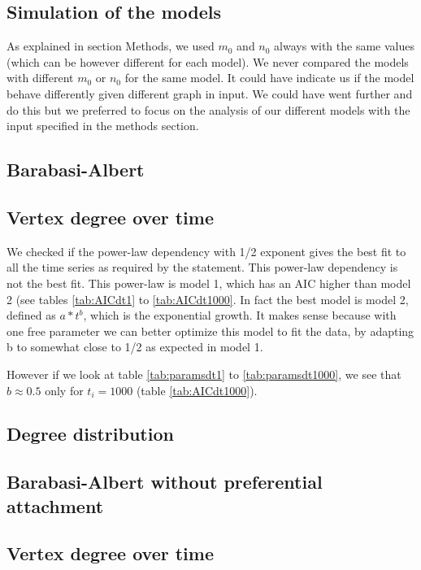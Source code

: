 \documentclass{article}
\begin{document}
\subsection{Simulation of the models}

As explained in section Methods, we used $m_0$ and $n_0$ always with the same
values (which can be however different for each model). We never compared the
models with different $m_0$ or $n_0$ for the same model. It could have indicate
us if the model behave differently given different graph in input. We could have
went further and do this but we preferred to focus on the analysis of our
different models with the input specified in the methods section.

\subsection{Barabasi-Albert}


\subsection{Vertex degree over time}

We checked if the power-law dependency with 1/2 exponent gives the best fit to
all the time series as required by the statement. This power-law dependency is
not the best fit. This power-law is model 1, which has an AIC higher than model
2 (see tables \ref{tab:AICdt1} to \ref{tab:AICdt1000}. In fact the best model is
model 2, defined as \textbf{$a*{t^b}$}, which is the exponential growth. It
makes sense because with one free parameter we can better optimize this model to
fit the data, by adapting b to somewhat close to 1/2 as expected in model 1.

However if we look at table \ref{tab:paramsdt1} to \ref{tab:paramsdt1000}, we
see that $b \approx 0.5$ only for $t_i = 1000$ (table \ref{tab:AICdt1000}).

\subsection{Degree distribution}

\subsection{Barabasi-Albert without preferential attachment}

\subsection{Vertex degree over time}
\end{document}
